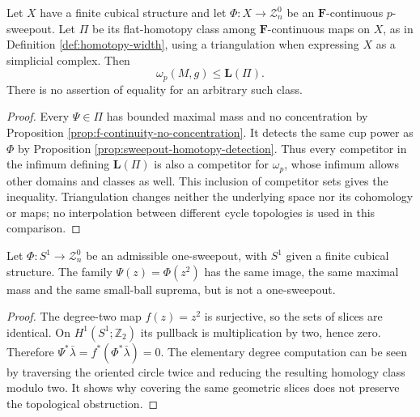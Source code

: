 \begin{proposition}\label{prop:fixed-class-bounds-spectrum}
Let $X$ have a finite cubical structure and let $\Phi:X\to\mathcal Z_n^0$ be an $\mathbf F$-continuous $p$-sweepout. Let $\Pi$ be its flat-homotopy class among $\mathbf F$-continuous maps on $X$, as in Definition \ref{def:homotopy-width}, using a triangulation when expressing $X$ as a simplicial complex. Then
\[
 \omega_p(M,g)\leq\mathbf L(\Pi).
\]
There is no assertion of equality for an arbitrary such class.
\end{proposition}
\begin{proof}
Every $\Psi\in\Pi$ has bounded maximal mass and no concentration by Proposition \ref{prop:f-continuity-no-concentration}. It detects the same cup power as $\Phi$ by Proposition \ref{prop:sweepout-homotopy-detection}. Thus every competitor in the infimum defining $\mathbf L(\Pi)$ is also a competitor for $\omega_p$, whose infimum allows other domains and classes as well. This inclusion of competitor sets gives the inequality. Triangulation changes neither the underlying space nor its cohomology or maps; no interpolation between different cycle topologies is used in this comparison.
\end{proof}

\begin{example}\label{ex:double-traversal-sweepout}
Let $\Phi:S^1\to\mathcal Z_n^0$ be an admissible one-sweepout, with $S^1$ given a finite cubical structure. The family $\Psi(z)=\Phi(z^2)$ has the same image, the same maximal mass and the same small-ball suprema, but is not a one-sweepout.
\end{example}
\begin{proof}
The degree-two map $f(z)=z^2$ is surjective, so the sets of slices are identical. On $H^1(S^1;\mathbb Z_2)$ its pullback is multiplication by two, hence zero. Therefore $\Psi^*\bar\lambda=f^*(\Phi^*\bar\lambda)=0$. The elementary degree computation can be seen by traversing the oriented circle twice and reducing the resulting homology class modulo two. It shows why covering the same geometric slices does not preserve the topological obstruction.
\end{proof}

